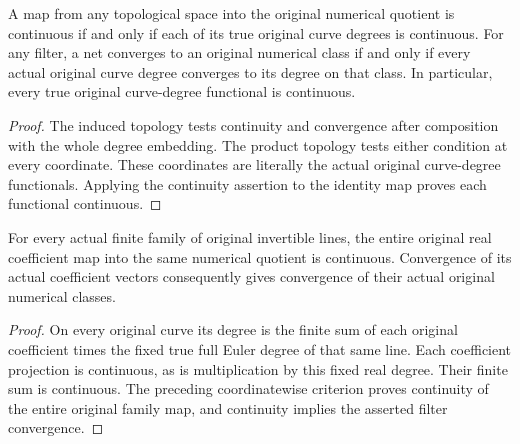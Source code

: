 \begin{theorem}
\label{thm:native-numerical-curve-weak-convergence}
\leanok
{}
A map from any topological space into the original numerical quotient is
continuous if and only if each of its true original curve degrees is
continuous. For any filter, a net converges to an original numerical class
if and only if every actual original curve degree converges to its degree
on that class. In particular, every true original curve-degree functional
is continuous.
\end{theorem}
\begin{proof}
The induced topology tests continuity and convergence after composition
with the whole degree embedding. The product topology tests either condition
at every coordinate. These coordinates are literally the actual original
curve-degree functionals. Applying the continuity assertion to the identity
map proves each functional continuous.
\end{proof}

\begin{theorem}
\label{thm:native-numerical-line-family-continuous}
\leanok
{}
For every actual finite family of original invertible lines, the entire
original real coefficient map into the same numerical quotient is
continuous. Convergence of its actual coefficient vectors consequently
gives convergence of their actual original numerical classes.
\end{theorem}
\begin{proof}
On every original curve its degree is the finite sum of each original
coefficient times the fixed true full Euler degree of that same line.
Each coefficient projection is continuous, as is multiplication by this
fixed real degree. Their finite sum is continuous. The preceding
coordinatewise criterion proves continuity of the entire original family
map, and continuity implies the asserted filter convergence.
\end{proof}

